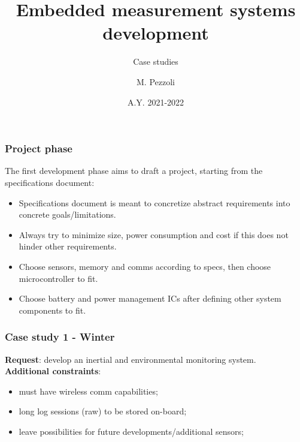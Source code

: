 \documentclass[11pt,xcolor=table,aspectratio=169]{beamer}
\title[Biomedical sensors 20/21]{Embedded measurement systems development}
\subtitle{Case studies}
\author{M. Pezzoli}
\date{A.Y. 2021-2022}
\begin{document}
	
	\maketitle
	\begin{frame}
		\frametitle{Project phase}
		The first development phase aims to draft a project, starting from the specifications document:
			\begin{itemize}
				\item Specifications document is meant to concretize abstract requirements into concrete goals/limitations.
				\item Always try to minimize size, power consumption and cost if this does not hinder other requirements.
				\item Choose sensors, memory and comms according to specs, then choose microcontroller to fit.
				\item Choose battery and power management ICs after defining other system components to fit.	
			\end{itemize}
	\end{frame}
	
	\begin{frame}
		\frametitle{Case study 1 - Winter}
		\textbf{Request}: develop an inertial and environmental monitoring system.\\
		\textbf{Additional constraints}:
		\begin{itemize}
			\item must have wireless comm capabilities;
			\item long log sessions (raw) to be stored on-board;
			\item leave possibilities for future developments/additional sensors;
		\end{itemize}
	\end{frame}
\end{document}
